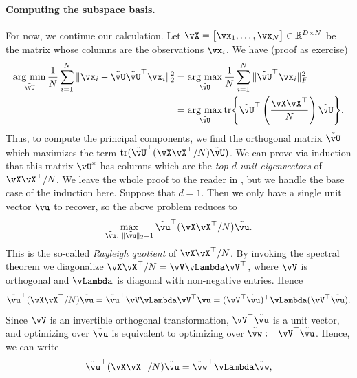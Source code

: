 \documentclass[../../book-main.tex]{subfiles}
\begin{document}
\paragraph{Computing the subspace basis.}
For now, we continue our calculation. Let \(\vX = \mat{\vx_{1}, \dots, \vx_{N}} \in \R^{D \times N}\) be the matrix whose columns are the observations \(\vx_{i}\). We have (proof as exercise)
\begin{align}
    \argmin_{\tilde{\vU}}\frac{1}{N}\sum_{i = 1}^{N}\norm{\vx_{i} - \tilde{\vU}\tilde{\vU}^{\top}\vx_{i}}_{2}^{2}
    &= \argmax_{\tilde{\vU}}\frac{1}{N}\sum_{i = 1}^{N}\norm{\tilde{\vU}^{\top}\vx_{i}}_{F}^{2} \\ 
    &= \argmax_{\tilde{\vU}}\tr\rc{\tilde{\vU}^{\top}\bp{\frac{\vX\vX^{\top}}{N}}\tilde{\vU}}.
\end{align}
Thus, to compute the principal components, we find the orthogonal matrix \(\tilde{\vU}\) which maximizes the term \(\tr(\tilde{\vU}^{\top}(\vX\vX^{\top}/N)\tilde{\vU})\). We can prove via induction that this matrix \(\vU^{\ast}\) has columns which are the \textit{top \(d\) unit eigenvectors} of \(\vX\vX^{\top}/N\). We leave the whole proof to the reader in , but we handle the base case of the induction here. Suppose that \(d = 1\). Then we only have a single unit vector \(\vu\) to recover, so the above problem reduces to
\begin{equation}
    \max_{\tilde{\vu} \colon \norm{\tilde{\vu}}_{2} = 1} \tilde{\vu}^{\top}(\vX\vX^{\top}/N)\tilde{\vu}.
\end{equation}
This is the so-called \textit{Rayleigh quotient} of \(\vX\vX^{\top}/N\). By invoking the spectral theorem we diagonalize \(\vX\vX^{\top}/N = \vV\vLambda\vV^{\top}\), where \(\vV\) is orthogonal and \(\vLambda\) is diagonal with non-negative entries. Hence 
\begin{equation}
    \tilde{\vu}^{\top}(\vX\vX^{\top}/N)\tilde{\vu} = \tilde{\vu}^{\top}\vV\vLambda\vV^{\top}\vu = (\vV^{\top}\tilde{\vu})^{\top}\vLambda(\vV^{\top}\tilde{\vu}).
\end{equation}
Since \(\vV\) is an invertible orthogonal transformation, \(\vV^{\top}\tilde{\vu}\) is a unit vector, and optimizing over \(\tilde{\vu}\) is equivalent to optimizing over \(\tilde{\vw} := \vV^{\top}\tilde{\vu}\). Hence, we can write
\begin{equation}
    \tilde{\vu}^{\top}(\vX\vX^{\top}/N)\tilde{\vu} = \tilde{\vw}^{\top}\vLambda\tilde{\vw},
\end{equation}
\end{document}
